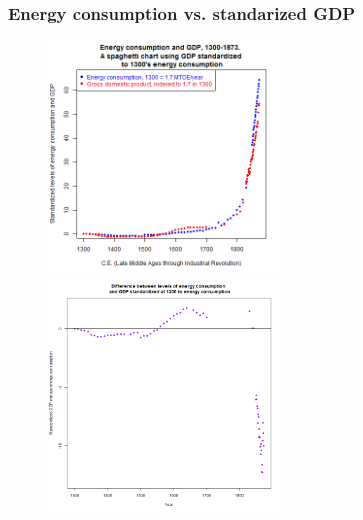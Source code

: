 \documentclass[final]{beamer}
\begin{document}
\begin{frame}
\frametitle{Energy consumption vs. standarized GDP}
\begin{figure}[p!]
\center
\label{fig:energyVsGdp}
		\centerline{
		\mbox{\includegraphics[width=0.55\textwidth]{energyVsGdp}}
		\mbox{\includegraphics[width=0.55\textwidth]{energyVsGdpDiff}}
		}
\end{figure}
\end{frame}
\end{document}
